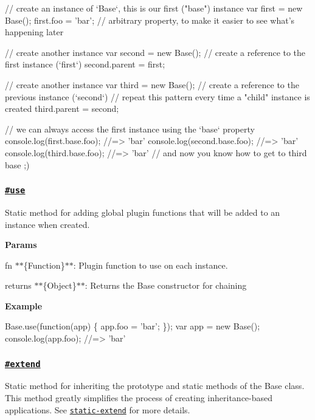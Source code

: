 \begin{DoxyCode}
// create an instance of `Base`, this is our first ("base") instance
var first = new Base();
first.foo = 'bar'; // arbitrary property, to make it easier to see what's happening later

// create another instance
var second = new Base();
// create a reference to the first instance (`first`)
second.parent = first;

// create another instance
var third = new Base();
// create a reference to the previous instance (`second`)
// repeat this pattern every time a "child" instance is created
third.parent = second;

// we can always access the first instance using the `base` property
console.log(first.base.foo);
//=> 'bar'
console.log(second.base.foo);
//=> 'bar'
console.log(third.base.foo);
//=> 'bar'
// and now you know how to get to third base ;)
\end{DoxyCode}


\subsubsection*{\href{index.js#L293}{\tt \#use}}

Static method for adding global plugin functions that will be added to an instance when created.

{\bfseries Params}


\begin{DoxyItemize}
\item {\ttfamily fn} $\ast$$\ast$\{Function\}$\ast$$\ast$\+: Plugin function to use on each instance.
\item {\ttfamily returns} $\ast$$\ast$\{Object\}$\ast$$\ast$\+: Returns the {\ttfamily Base} constructor for chaining
\end{DoxyItemize}

{\bfseries Example}


\begin{DoxyCode}
Base.use(function(app) \{
  app.foo = 'bar';
\});
var app = new Base();
console.log(app.foo);
//=> 'bar'
\end{DoxyCode}


\subsubsection*{\href{index.js#L337}{\tt \#extend}}

Static method for inheriting the prototype and static methods of the {\ttfamily Base} class. This method greatly simplifies the process of creating inheritance-\/based applications. See \href{https://github.com/jonschlinkert/static-extend}{\tt static-\/extend} for more details.

